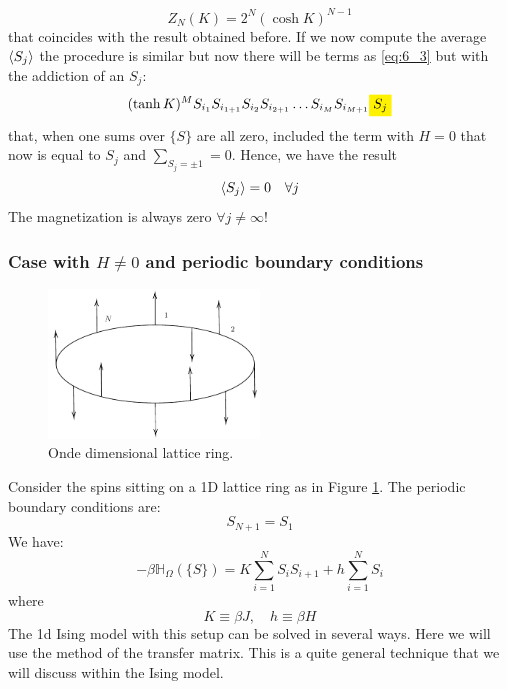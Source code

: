 \documentclass[../main/main.tex]{subfiles}
\begin{document}
\begin{equation}
  Z_N (K) = 2^N (\cosh K)^{N-1}
\end{equation}
that coincides with the result obtained before. If we now compute the average \( \expval{S_j}  \) the procedure is similar but now there will be terms as \eqref{eq:6_3} but with the addiction of an \( S_j \):
\begin{equation}
  (\tanh K)^M S_{i_1} S_{i_{1+1}} S_{i_2} S_{i_{2+1}} \dots S_{i_M} S_{i_{M+1}} \mathcolorbox{yellow}{S_j}
\end{equation}
that, when one sums over \( \{ S \}   \) are all zero, included the term with \( H=0 \) that now is equal to \( S_j \) and \( \sum_{S_j = \pm 1}^{} = 0   \). Hence, we have the result
\begin{equation}
  \expval{S_j} = 0 \quad \forall j
\end{equation}
The magnetization is always zero \( \forall j \neq \infty  \)!


\subsubsection{Case with \( H\neq0 \) and periodic boundary conditions}
\begin{figure}[h!]
\centering
\includegraphics[width=0.5\textwidth]{../lessons/6_image/4.pdf}
\caption{\label{fig:6_4} Onde dimensional lattice ring.}
\end{figure}
Consider the spins sitting on a 1D lattice ring as in Figure \ref{fig:6_4}. The periodic boundary conditions are:
\begin{equation}
  S_{N+1}=S_1
\end{equation}
We have:
\begin{equation}
  -\beta \mathbb{H}_ \Omega  ( \{ S \}  ) = K \sum_{i=1}^{N} S_i S_{i+1} + h \sum_{i=1}^{N} S_i
\end{equation}
where
\begin{equation}
   K \equiv \beta J,  \quad h \equiv \beta H
\end{equation}
The 1d Ising model with this setup can be solved in several ways. Here we will use the method of the transfer matrix. This is a quite general technique that we will discuss within the Ising model.
\end{document}
